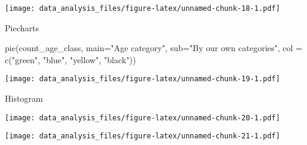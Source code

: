 \documentclass[
]{article}
\newenvironment{Shaded}{\begin{snugshade}}{\end{snugshade}}
\newcommand{\AttributeTok}[1]{\textcolor[rgb]{0.77,0.63,0.00}{#1}}
\newcommand{\DecValTok}[1]{\textcolor[rgb]{0.00,0.00,0.81}{#1}}
\newcommand{\FunctionTok}[1]{\textcolor[rgb]{0.00,0.00,0.00}{#1}}
\newcommand{\NormalTok}[1]{#1}
\newcommand{\SpecialCharTok}[1]{\textcolor[rgb]{0.00,0.00,0.00}{#1}}
\newcommand{\StringTok}[1]{\textcolor[rgb]{0.31,0.60,0.02}{#1}}
\begin{document}
\texttt{[image: data\_analysis\_files/figure-latex/unnamed-chunk-18-1.pdf]}

Piecharts

\begin{Shaded}
\begin{Highlighting}[]
\FunctionTok{pie}\NormalTok{(count\_age\_class, }
    \AttributeTok{main=}\StringTok{"Age category"}\NormalTok{,}
    \AttributeTok{sub=}\StringTok{"By our own categories"}\NormalTok{,}
    \AttributeTok{col =} \FunctionTok{c}\NormalTok{(}\StringTok{"green"}\NormalTok{, }\StringTok{"blue"}\NormalTok{, }\StringTok{"yellow"}\NormalTok{, }\StringTok{"black"}\NormalTok{))}
\end{Highlighting}
\end{Shaded}

\texttt{[image: data\_analysis\_files/figure-latex/unnamed-chunk-19-1.pdf]}

Histogram

\begin{Shaded}
\end{Shaded}

\texttt{[image: data\_analysis\_files/figure-latex/unnamed-chunk-20-1.pdf]}

\begin{Shaded}
\end{Shaded}

\texttt{[image: data\_analysis\_files/figure-latex/unnamed-chunk-21-1.pdf]}
\end{document}
